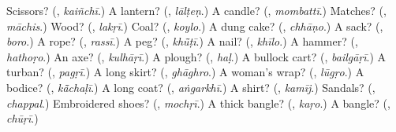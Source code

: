 \begin{tcolorbox}[breakable,colback=teal!4,colframe=teal!35!black,title={Before you move on}]
Scissors? (\textbf{}, \emph{kaiñchī}.) A lantern? (\textbf{}, \emph{lālṭeṇ}.) A candle? (\textbf{}, \emph{mombattī}.) Matches? (\textbf{}, \emph{māchis}.) Wood? (\textbf{}, \emph{lakṛī}.) Coal? (\textbf{}, \emph{koylo}.) A dung cake? (\textbf{}, \emph{chhāṇo}.) A sack? (\textbf{}, \emph{boro}.) A rope? (\textbf{}, \emph{rassī}.) A peg? (\textbf{}, \emph{khū̃ṭī}.) A nail? (\textbf{}, \emph{khīlo}.) A hammer? (\textbf{}, \emph{hathoṛo}.) An axe? (\textbf{}, \emph{kulhāṛī}.) A plough? (\textbf{}, \emph{haḷ}.) A bullock cart? (\textbf{}, \emph{bailgāṛī}.) A turban? (\textbf{}, \emph{pagṛī}.) A long skirt? (\textbf{}, \emph{ghāghro}.) A woman's wrap? (\textbf{}, \emph{lūgṛo}.) A bodice? (\textbf{}, \emph{kā̃chaḷī}.) A long coat? (\textbf{}, \emph{aṅgarkhī}.) A shirt? (\textbf{}, \emph{kamīj}.) Sandals? (\textbf{}, \emph{chappal}.) Embroidered shoes? (\textbf{}, \emph{mochṛī}.) A thick bangle? (\textbf{}, \emph{kaṛo}.) A bangle? (\textbf{}, \emph{chūṛī}.)
\end{tcolorbox}
